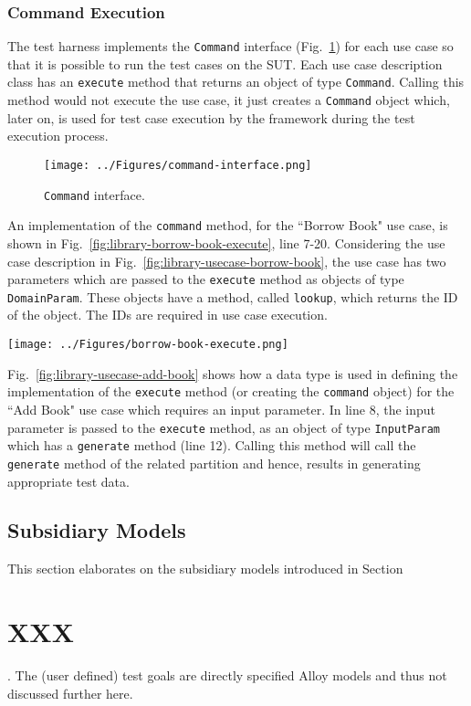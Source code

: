 \subsubsection{Command Execution}
\label{sec:test-harness-command-execution}
The test harness implements the \texttt{Command} interface (Fig.~\ref{fig:test-harness-command-interface}) for each use case so that it is possible to run the test cases on the SUT. Each use case description class has an \texttt{execute} method that returns an object of type \texttt{Command}. Calling this method would not execute the use case, it just creates a \texttt{Command} object which, later on, is used for test case execution by the framework during the test execution process.

\begin{figure}[h]
\centering
\texttt{[image: ../Figures/command-interface.png]}
\caption{\texttt{Command} interface.}
\label{fig:test-harness-command-interface}
\end{figure}

An implementation of the \texttt{command} method, for the ``Borrow Book" use case, is shown in Fig.~\ref{fig:library-borrow-book-execute}, line 7-20. Considering the use case description in Fig.~\ref{fig:library-usecase-borrow-book}, the use case has two parameters which are passed to the \texttt{execute} method as objects of type \texttt{DomainParam}. These objects have a method, called \texttt{lookup}, which returns the ID of the object. The IDs are required in use case execution.

\begin{figure*}[h]
\centering
\texttt{[image: ../Figures/borrow-book-execute.png]}
\caption{Implementation of the \texttt{Command} interface for ``Borrow Book" use case.}
\label{fig:library-borrow-book-execute}
\end{figure*}

Fig.~\ref{fig:library-usecase-add-book} shows how a data type is used in defining the implementation of the \texttt{execute} method (or creating the \texttt{command} object) for the ``Add Book" use case which requires an input parameter.  In line 8, the input parameter is passed to the \texttt{execute} method, as an object of type \texttt{InputParam} which has a \texttt{generate} method (line 12). Calling this method will call the \texttt{generate} method of the related partition and hence, results in generating appropriate test data. 

\subsection{Subsidiary Models}
\label{sec:create-test model-subsidiary-models}
This section elaborates on the subsidiary models introduced in Section~\section{XXX}.
The (user defined) test goals are directly specified Alloy models and thus not discussed further here.

